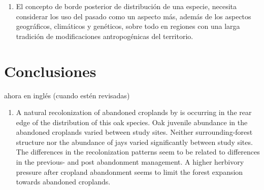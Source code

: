\begin{enumerate}
    \item El concepto de borde posterior de distribución de una especie, necesita considerar los uso del pasado como un aspecto más, además de los aspectos geográficos, climáticos y genéticos, sobre todo en regiones con una larga tradición de modificaciones antropogénicas del territorio.  
    
    
    
    
    

    
\end{enumerate}




\section*{Conclusiones}\label{sec:conclussions:en}

ahora en inglés (cuando estén revisadas) 

\begin{enumerate}
\renewcommand{\labelenumi}{\textbf{\textcolor{ctcolormain}{\arabic{enumi}.}}}

    \item A natural recolonization of abandoned croplands by \Qp is occurring in the rear edge of the distribution of this oak species. Oak juvenile abundance in the abandoned croplands varied between study sites. Neither surrounding-forest structure nor the abundance of jays varied significantly between study sites. The differences in the recolonization patterns seem to be related to differences in the previous- and post abandonment management. A higher herbivory pressure after cropland abandonment seems to limit the forest expansion towards abandoned croplands.
    
    
\end{enumerate}